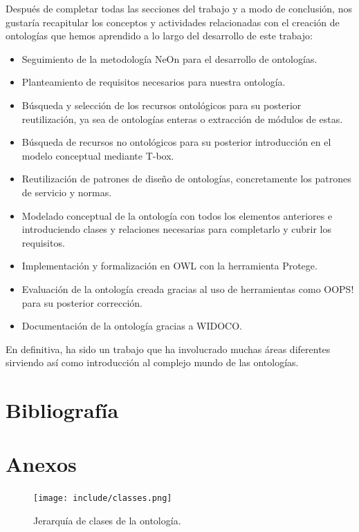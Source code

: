 \documentclass[a4paper,12pt]{article}
\begin{document}
	Después de completar todas las secciones del trabajo y a modo de conclusión, nos gustaría
	recapitular los conceptos y actividades relacionadas con el creación de ontologías que hemos
	aprendido a lo largo del desarrollo de este trabajo:
	\begin{itemize}
		\item Seguimiento de la metodología NeOn para el desarrollo de ontologías.
		\item Planteamiento de requisitos necesarios para nuestra ontología.
		\item Búsqueda y selección de los recursos ontológicos para su posterior reutilización, ya sea
de ontologías enteras o extracción de módulos de estas.
		\item Búsqueda de recursos no ontológicos para su posterior introducción en el modelo
		conceptual mediante T-box.
		\item Reutilización de patrones de diseño de ontologías, concretamente los patrones de
		servicio y normas.
		\item Modelado conceptual de la ontología con todos los elementos anteriores e
		introduciendo clases y relaciones necesarias para completarlo y cubrir los requisitos.
		\item Implementación y formalización en OWL con la herramienta Protege.
		\item Evaluación de la ontología creada gracias al uso de herramientas como OOPS! para su
		posterior corrección.
		\item Documentación de la ontología gracias a WIDOCO.
	\end{itemize}
	En definitiva, ha sido un trabajo que ha involucrado muchas áreas diferentes sirviendo así como
introducción al complejo mundo de las ontologías.
	
\newpage
	\section*{Bibliografía}
	
	
	
	\newpage
	\section*{Anexos}
	
	\begin{figure}[H]
		\centering
		\texttt{[image: include/classes.png]}
		\caption{Jerarquía de clases de la ontología.}
	\end{figure}
\end{document}
